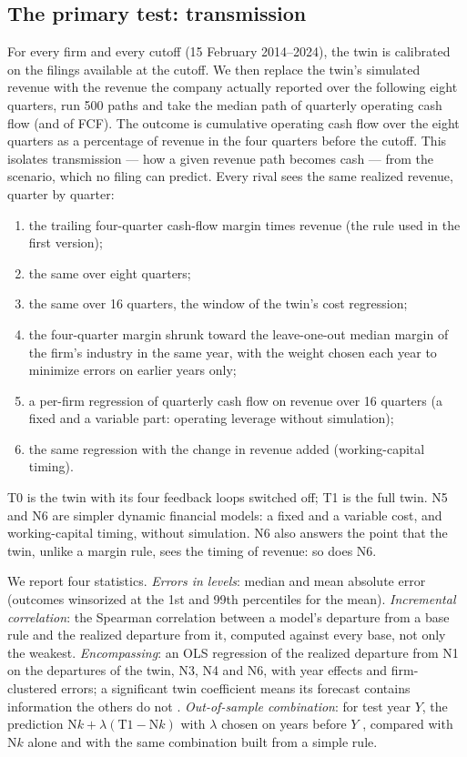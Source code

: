 \documentclass[11pt]{article}
\begin{document}
\subsection{The primary test: transmission}
For every firm and every cutoff (15 February 2014--2024), the twin is calibrated on the filings available at the cutoff. We then replace the twin's simulated revenue with the revenue the company actually reported over the following eight quarters, run 500 paths and take the median path of quarterly operating cash flow (and of FCF). The outcome is cumulative operating cash flow over the eight quarters as a percentage of revenue in the four quarters before the cutoff. This isolates transmission --- how a given revenue path becomes cash --- from the scenario, which no filing can predict. Every rival sees the same realized revenue, quarter by quarter:
\begin{enumerate}[label=N\arabic*]
\item the trailing four-quarter cash-flow margin times revenue (the rule used in the first version);
\item the same over eight quarters;
\item the same over 16 quarters, the window of the twin's cost regression;
\item the four-quarter margin shrunk toward the leave-one-out median margin of the firm's industry in the same year, with the weight chosen each year to minimize errors on earlier years only;
\item a per-firm regression of quarterly cash flow on revenue over 16 quarters (a fixed and a variable part: operating leverage without simulation);
\item the same regression with the change in revenue added (working-capital timing).
\end{enumerate}
\noindent T0 is the twin with its four feedback loops switched off; T1 is the full twin. N5 and N6 are simpler dynamic financial models: a fixed and a variable cost, and working-capital timing, without simulation. N6 also answers the point that the twin, unlike a margin rule, sees the timing of revenue: so does N6.

We report four statistics. \emph{Errors in levels}: median and mean absolute error (outcomes winsorized at the 1st and 99th percentiles for the mean). \emph{Incremental correlation}: the Spearman correlation between a model's departure from a base rule and the realized departure from it, computed against every base, not only the weakest. \emph{Encompassing}: an OLS regression of the realized departure from N1 on the departures of the twin, N3, N4 and N6, with year effects and firm-clustered errors; a significant twin coefficient means its forecast contains information the others do not \citep{chong1986,fair1990}. \emph{Out-of-sample combination}: for test year $Y$, the prediction $\text{N}k+\lambda(\text{T1}-\text{N}k)$ with $\lambda$ chosen on years before $Y$ \citep{bates1969}, compared with N$k$ alone and with the same combination built from a simple rule.
\end{document}

